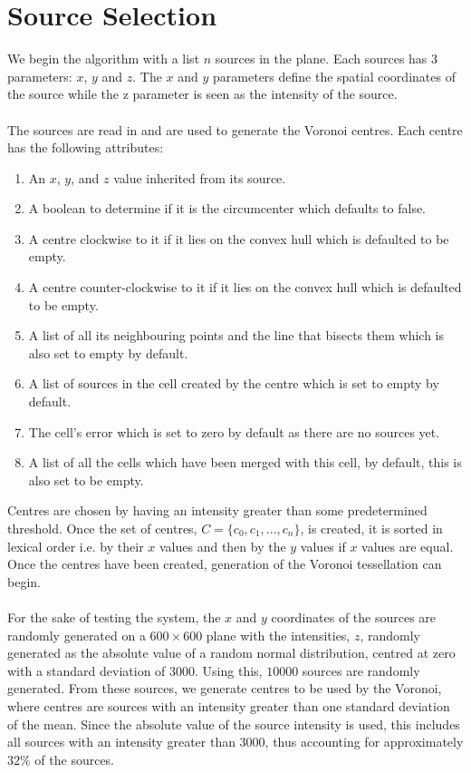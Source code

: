 \section{Source Selection}\label{sec:design:source}
We begin the algorithm with a list $n$ sources in the plane. Each sources has 3 parameters: $x$, $y$ and $z$. The $x$ and $y$ parameters define the spatial coordinates of the source while the z parameter is seen as the intensity of the source.
\\
\\
The sources are read in and are used to generate the Voronoi centres. Each centre has the following attributes:
\begin{enumerate}
\item An $x$, $y$, and $z$ value inherited from its source.
\item A boolean to determine if it is the circumcenter which defaults to false.
\item A centre clockwise to it if it lies on the convex hull which is defaulted to be empty.
\item A centre counter-clockwise to it if it lies on the convex hull which is defaulted to be empty.
\item A list of all its neighbouring points and the line that bisects them which is also set to empty by default.
\item A list of sources in the cell created by the centre which is set to empty by default.
\item The cell's error which is set to zero by default as there are no sources yet.
\item A list of all the cells which have been merged with this cell, by default, this is also set to be empty.
\end{enumerate} 
Centres are chosen by having an intensity greater than some predetermined threshold. Once the set of centres, $C= \{c_0,c_1,...,c_n\}$, is created, it is sorted in lexical order i.e. by their $x$ values and then by the $y$ values if $x$ values are equal. Once the centres have been created, generation of the Voronoi tessellation can begin.
\\
\\
For the sake of testing the system, the $x$ and $y$ coordinates of the sources are randomly generated on a $600 \times 600$ plane with the intensities, $z$, randomly generated as the absolute value of a random normal distribution, centred at zero with a standard deviation of $3000$. Using this, $10000$ sources are randomly generated. From these sources, we generate centres to be used by the Voronoi, where centres are sources with an intensity greater than one standard deviation of the mean. Since the absolute value of the source intensity is used, this includes all sources with an intensity greater than 3000, thus accounting for approximately $32\%$ of the sources.
